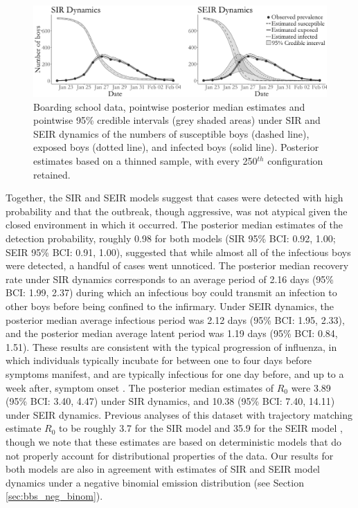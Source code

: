 \begin{figure}[ht!]
	\centering
	\includegraphics[width=\linewidth]{figures/bbs_latent_posts.pdf}
	\caption{Boarding school data, pointwise posterior median estimates and pointwise 95\% credible intervals (grey shaded areas) under SIR and SEIR dynamics of the numbers of susceptible boys (dashed line), exposed boys (dotted line), and infected boys (solid line). Posterior estimates based on a thinned sample, with every 250$ ^{th} $ configuration retained.}
	\label{fig:bbs_dat}
\end{figure}

Together, the SIR and SEIR models suggest that cases were detected with high probability and that the outbreak, though aggressive, was not atypical given the closed environment in which it occurred. The posterior median estimates of the detection probability, roughly 0.98 for both models (SIR 95\% BCI: 0.92, 1.00; SEIR 95\% BCI: 0.91, 1.00), suggested that while almost all of the infectious boys were detected, a handful of cases went unnoticed. The posterior median recovery rate under SIR dynamics corresponds to an average period of 2.16 days (95\% BCI: 1.99, 2.37) during which an infectious boy could transmit an infection to other boys before being confined to the infirmary. Under SEIR dynamics, the posterior median average infectious period was 2.12 days (95\% BCI: 1.95, 2.33), and the posterior median average latent period was 1.19 days (95\% BCI: 0.84, 1.51). These results are consistent with the typical progression of influenza, in which individuals typically incubate for between one to four days before symptoms manifest, and are typically infectious for one day before, and up to a week after, symptom onset \citep{cdcFlu}. The posterior median estimates of $ R_0 $ were 3.89 (95\% BCI: 3.40, 4.47) under SIR dynamics, and 10.38 (95\% BCI: 7.40, 14.11) under SEIR dynamics. Previous analyses of this dataset with trajectory matching estimate $ R_0 $ to be roughly 3.7 for the SIR model and 35.9 for the SEIR model \citep{wearing2005, keeling2008}, though we note that these estimates are based on deterministic models that do not properly account for distributional properties of the data. Our results for both models are also in agreement with estimates of SIR and SEIR model dynamics under a negative binomial emission distribution (see Section \ref{sec:bbs_neg_binom}).

